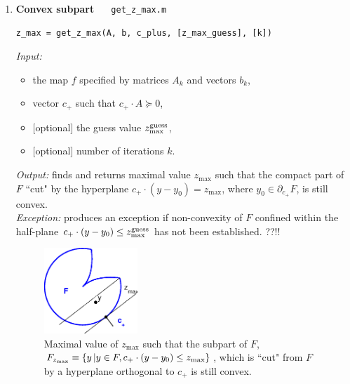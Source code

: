 \documentclass[a4paper]{article}
\theoremstyle{definition}
\begin{document}
\begin{enumerate}
\item {\bf Convex subpart\ \ \ }{\tt get\_z\_max.m}
\begin{verbatim}
z_max = get_z_max(A, b, c_plus, [z_max_guess], [k])
\end{verbatim}
{\it Input:}
\begin{itemize}
	\item the map $f$ specified by matrices $A_k$ and vectors $b_k$,
	\item vector $c_+$ such that $c_+\cdot A\succeq 0$,
	\item $[$optional$]$ the guess value  $z^{\rm guess}_{\rm max}$,
	\item $[$optional$]$ number of iterations $k$.
\end{itemize}
{\it Output:} finds and returns maximal value $z_{\max}$ such that the compact part of $F$ ``cut" by the hyperplane  $c_+ \cdot (y-y_0)=z_{\max}$, where $y_0\in \partial_{c_+}F$, is still convex. \\
{\it Exception:} produces an exception if non-convexity of $F$ confined within the half-plane $c_+ \cdot (y-y_0)\leq z^{\rm guess}_{\rm max}$  has not been established.  ??!!

\begin{figure}[H]
	\centering\includegraphics[width=100pt]{fig/get_z_max}
	\caption{Maximal value of $z_{\max}$ such that  the subpart of $F$, $F_{z_{\rm max}}\equiv \{y\, | y\in F, c_+ \cdot (y-y_0)\leq z_{\rm max}\}$, which is ``cut" from $F$ by a hyperplane orthogonal  to $c_+$ is still convex.}
\label{fig:four}
\end{figure}




\end{enumerate}
\end{document}
